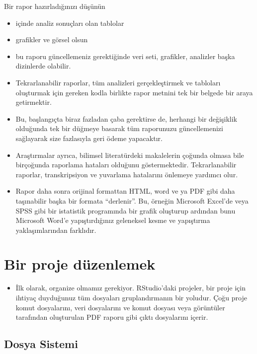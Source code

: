 \documentclass[
  oneside]{book}
\providecommand{\tightlist}{%
  \setlength{\itemsep}{0pt}\setlength{\parskip}{0pt}}
\begin{document}
Bir rapor hazırladığınızı düşünün

\begin{itemize}
\item
  içinde analiz sonuçları olan tablolar
\item
  grafikler ve görsel olsun
\item
  bu raporu güncellemeniz gerektiğinde veri seti, grafikler, analizler başka dizinlerde olabilir.
\item
  Tekrarlanabilir raporlar, tüm analizleri gerçekleştirmek ve tabloları oluşturmak için gereken kodla birlikte rapor metnini tek bir belgede bir araya getirmektir.
\item
  Bu, başlangıçta biraz fazladan çaba gerektirse de, herhangi bir değişiklik olduğunda tek bir düğmeye basarak tüm raporunuzu güncellemenizi sağlayarak size fazlasıyla geri ödeme yapacaktır.
\item
  Araştırmalar ayrıca, bilimsel literatürdeki makalelerin çoğunda olmasa bile birçoğunda raporlama hataları olduğunu göstermektedir. Tekrarlanabilir raporlar, transkripsiyon ve yuvarlama hatalarını önlemeye yardımcı olur.
\item
  Rapor daha sonra orijinal formattan HTML, word ve ya PDF gibi daha taşınabilir başka bir formata ``derlenir''. Bu, örneğin Microsoft Excel'de veya SPSS gibi bir istatistik programında bir grafik oluşturup ardından bunu Microsoft Word'e yapıştırdığınız geleneksel kesme ve yapıştırma yaklaşımlarından farklıdır.
\end{itemize}

\hypertarget{bir-proje-duxfczenlemek}{%
\section{Bir proje düzenlemek}\label{bir-proje-duxfczenlemek}}

\begin{itemize}
\tightlist
\item
  İlk olarak, organize olmamız gerekiyor. RStudio'daki projeler, bir proje için ihtiyaç duyduğunuz tüm dosyaları gruplandırmanın bir yoludur. Çoğu proje komut dosyalarını, veri dosyalarını ve komut dosyası veya görüntüler tarafından oluşturulan PDF raporu gibi çıktı dosyalarını içerir.
\end{itemize}

\hypertarget{dosya-sistemi}{%
\subsection{Dosya Sistemi}\label{dosya-sistemi}}
\end{document}
